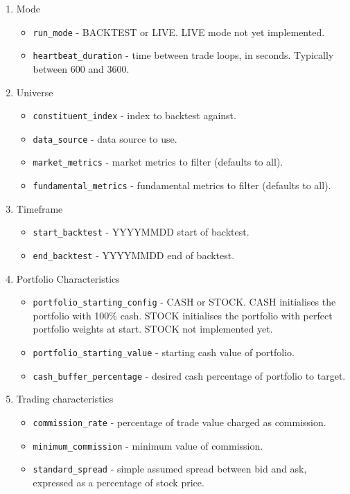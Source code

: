\documentclass[11pt,preprint, authoryear]{elsarticle}
\numberwithin{equation}{section}
\numberwithin{figure}{section}
\numberwithin{table}{section}
\def\tightlist{} %
\begin{document}
\begin{enumerate}
\def\labelenumi{\arabic{enumi}.}
\tightlist
\item
  Mode

  \begin{itemize}
  \tightlist
  \item
    \texttt{run\_mode} - BACKTEST or LIVE. LIVE mode not yet
    implemented.
  \item
    \texttt{heartbeat\_duration} - time between trade loops, in seconds.
    Typically between 600 and 3600.
  \end{itemize}
\item
  Universe

  \begin{itemize}
  \tightlist
  \item
    \texttt{constituent\_index} - index to backtest against.
  \item
    \texttt{data\_source} - data source to use.
  \item
    \texttt{market\_metrics} - market metrics to filter (defaults to
    all).
  \item
    \texttt{fundamental\_metrics} - fundamental metrics to filter
    (defaults to all).
  \end{itemize}
\item
  Timeframe

  \begin{itemize}
  \tightlist
  \item
    \texttt{start\_backtest} - YYYYMMDD start of backtest.
  \item
    \texttt{end\_backtest} - YYYYMMDD end of backtest.
  \end{itemize}
\item
  Portfolio Characteristics

  \begin{itemize}
  \tightlist
  \item
    \texttt{portfolio\_starting\_config} - CASH or STOCK. CASH
    initialises the portfolio with 100\% cash. STOCK initialises the
    portfolio with perfect portfolio weights at start. STOCK not
    implemented yet.
  \item
    \texttt{portfolio\_starting\_value} - starting cash value of
    portfolio.
  \item
    \texttt{cash\_buffer\_percentage} - desired cash percentage of
    portfolio to target.
  \end{itemize}
\item
  Trading characteristics

  \begin{itemize}
  \tightlist
  \item
    \texttt{commission\_rate} - percentage of trade value charged as
    commission.
  \item
    \texttt{minimum\_commission} - minimum value of commission.
  \item
    \texttt{standard\_spread} - simple assumed spread between bid and
    ask, expressed as a percentage of stock price.
  \end{itemize}
\end{enumerate}
\end{document}
